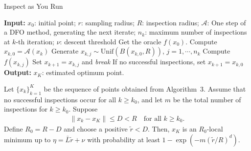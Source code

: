 {\begin{singlespace}
    \centering
\begin{minipage}{.7\linewidth}
\begin{algorithm}[H]
    \caption{Inspect as You Run}
    \begin{algorithmic}[1]
      \State \textbf{Input:} $x_0$: initial point; $r$: sampling radius; $R$: inspection radius; $\mathcal{A}$: One step of a DFO method, generating the next iterate; $n_k$: maximum number of inspections at $k$-th iteration; $\nu$: descent threshold
      \State Get the oracle $f(x_0)$.
            \State Compute $x_{k, 0} = \mathcal{A}(x_k)$
            \State Generate $x_{k,j} \sim \textrm{Unif}(B(x_{k,0}, R))$, $j=1,\cdots,n_k$
                \State Compute $f(x_{k,j})$ 
                    \State Set $x_{k+1} = x_{k,j}$ and \emph{break}
                \EndIf
            \EndFor
            \State If no successful inspections, set $x_{k+1} = x_{k,0}$
      \EndFor
       \State \textbf{Output:} $x_K$: estimated optimum point.
    \end{algorithmic}
    \end{algorithm}
\end{minipage}
\par
\end{singlespace}
}

{\begin{singlespace}
\begin{theorem*}
    Let $\{x_k\}_{k=1}^{K}$ be the sequence of points obtained from Algorithm~3. Assume that no successful inspections occur for all $k \geq k_0$, and let $m$ be the total number of inspections for $k \geq k_0$. Suppose
    \begin{align*}
        \|x_{k} - x_K\| \leq D < R \quad \text{for all } k \geq k_0.
    \end{align*}
    Define $R_0 = R-D$ and choose a positive $\tilde{r} < D$. Then, $x_K$ is an $R_0$-local minimum up to $\eta = \bar{L}\tilde{r} + \nu$ with probability at least $1-\exp(- m (\tilde{r}/R)^d)$.
\end{theorem*}\end{singlespace}
}